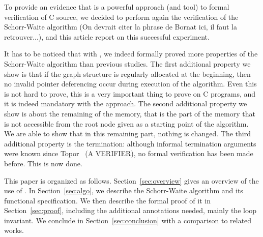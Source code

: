 To provide an evidence that \caduceus{} is a powerful approach (and
tool) to formal verification of C source, we decided to perform again
the verification of the Schorr-Waite algorithm (On devrait citer la
phrase de Bornat ici, il faut la retrouver...), and this article report
on this successful experiment.

It has to be noticed that with \caduceus{}, we indeed formally proved
more properties of the Schorr-Waite algorithm than previous studies.
The first additional property we show is that if the graph structure
is regularly allocated at the beginning, then no invalid pointer
deferencing occur during execution of the algorithm. Even this is not
hard to prove, this is a very important thing to prove on C programs,
and it is indeed mandatory with the \caduceus{} approach. The second
additional property we show is about the remaining of the memory, that
is the part of the memory that is not accessible from the root node
given as a starting point of the algorithm. We are able to show that
in this remaining part, nothing is changed. The third additional
property is the termination: although informal termination arguments
were known since Topor~\cite{topor79acta} (A VERIFIER), no formal
verification has been made before. This is now done.

This paper is organized as follows.  Section~\ref{sec:overview} gives
an overview of the use of \caduceus{}.  In Section~\ref{sec:algo}, we
describe the Schorr-Waite algorithm and its functional specification.
We then describe the formal proof of it in Section~\ref{sec:proof},
including the additional annotations needed, mainly the loop
invariant.  We conclude in Section~\ref{sec:conclusion} with a
comparison to related works.





